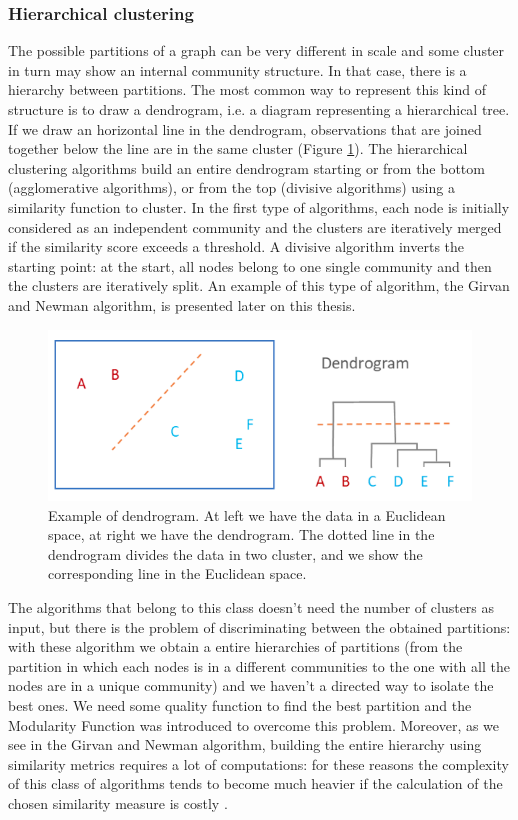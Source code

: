 \subsubsection{Hierarchical clustering}
The possible partitions of a graph can be very different in scale and some cluster in turn may show an internal community structure. In that case, there is a hierarchy between partitions. The most common way to represent this kind of structure is to draw a dendrogram, i.e. a diagram representing a hierarchical tree. If we draw an horizontal line in the dendrogram, observations that are joined together below the line are in the same cluster (Figure \ref{fig:dend}). The hierarchical clustering algorithms build an entire dendrogram starting or from the bottom (agglomerative algorithms), or from the top (divisive algorithms) using a similarity function to cluster. In the first type of algorithms, each node is initially considered as an independent community and the clusters are iteratively merged if the similarity score exceeds a threshold. A divisive algorithm inverts the starting point: at the start, all nodes belong to one single community and then the clusters are iteratively split. An example of this type of algorithm, the Girvan and Newman algorithm, is presented later on this thesis. 
\begin{figure}
	\centering
	\includegraphics[width=0.7\linewidth]{0-resources/dend.png}
	\caption{Example of dendrogram. At left we have the data in a Euclidean space, at right we have the dendrogram. The dotted line in the dendrogram divides the data in two cluster, and we show the corresponding line in the Euclidean space. }
	\label{fig:dend}
\end{figure}
The algorithms that belong to this class doesn't need the number 
of clusters as input, but there is the problem of discriminating between the obtained partitions: with these algorithm we obtain a entire hierarchies of partitions (from the partition in which each nodes is in a different communities to the one with all the nodes are in a unique community) and we haven't a directed way to isolate the best ones. We need some quality function to find the best partition and the Modularity Function was introduced to overcome this problem. Moreover, as we see in the Girvan and Newman algorithm, building the entire hierarchy using similarity metrics requires a lot of computations: for these reasons the complexity of this class of algorithms tends to become much heavier if the calculation of the chosen similarity measure is costly \cite{fortunato}.

